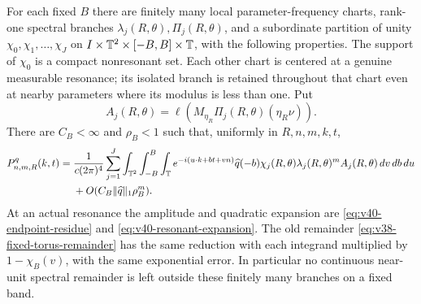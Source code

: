 \begin{theorem}
\label{thm:v40-uniform-resonant-reduction}
For each fixed $B$ there are finitely many local parameter-frequency
charts, rank-one spectral branches $\lambda_j(R,\theta),\Pi_j(R,\theta)$,
and a subordinate partition of unity $\chi_0,\chi_1,\ldots,\chi_J$
on $I\times\mathbb T^2\times[-B,B]\times\mathbb T$, with the following properties.
The support of $\chi_0$ is a compact nonresonant set. Each other chart
is centered at a genuine measurable resonance; its isolated branch
is retained throughout that chart even at nearby parameters where
its modulus is less than one. Put
\[
 A_j(R,\theta)=\ell(M_{\eta_R}\Pi_j(R,\theta)(\eta_R\nu)).
\]
There are $C_B<\infty$ and $\rho_B<1$ such that, uniformly in
$R,n,m,k,t$,
\begin{align}
 P^q_{n,m,R}(k,t)
  ={}&\frac1{c(2\pi)^4}\sum_{j=1}^J
       \int_{\T^2}\int_{-B}^B\int_\T
       e^{-i(u\cdot k+bt+vn)}\widehat q(-b)
       \chi_j(R,\theta)\lambda_j(R,\theta)^m A_j(R,\theta)
                         \,dv\,db\,du\notag\\
     &+O(C_B\|\widehat q\|_1\rho_B^m).
                                      \label{eq:v40-fixed-spectral-inverse}
\end{align}
At an actual resonance the amplitude and quadratic expansion are
\eqref{eq:v40-endpoint-residue} and
\eqref{eq:v40-resonant-expansion}. The old remainder
\eqref{eq:v38-fixed-torus-remainder} has the same reduction with each
integrand multiplied by $1-\chi_B(v)$, with the same exponential
error. In particular no continuous near-unit spectral remainder is
left outside these finitely many branches on a fixed band.
\end{theorem}
